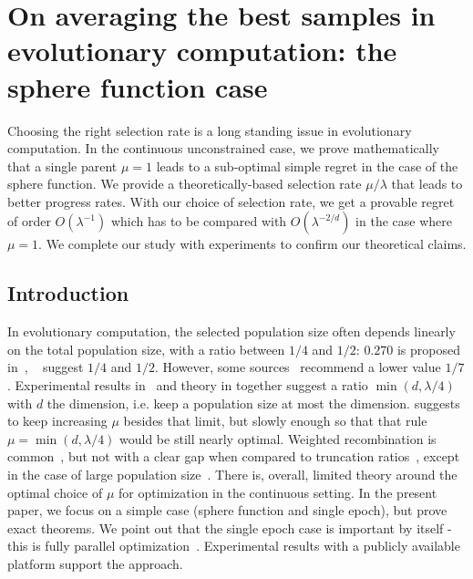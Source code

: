 \chapter{On averaging the best samples in evolutionary computation: the sphere function case}
Choosing the right selection rate is a long standing issue in evolutionary computation. {In the continuous unconstrained case, }we prove mathematically that a single parent $\mu=1$ leads to a sub-optimal simple regret in the case of the sphere function. We provide a theoretically-based selection rate $\mu/\lambda$ that leads  to better progress rates. With our choice of selection rate, we get a provable regret of order $O(\lambda^{-1})$ which has to be compared with $O(\lambda^{-2/d})$ in the case where $\mu=1$. We complete our study with experiments to confirm our theoretical claims. %
\section{Introduction}
In evolutionary computation, the selected population size often depends linearly on the total population size, with a ratio between $1/4$ and $1/2$: $0.270$ is proposed in~\cite{escompr}, ~\cite{HAN,cmsa} suggest $1/4$ and $1/2$.
However,
some sources~\cite{amorales} recommend a lower value $1/7$. Experimental results in~\cite{ratio} and theory in \cite{fournierAlgorithmica} together suggest a ratio $\min(d,\lambda/4)$ with $d$ the dimension, i.e. keep a population size at most the dimension. \cite{jeb} suggests to keep increasing $\mu$ besides that limit, but slowly enough so that that rule $\mu=\min(d,\lambda/4)$ would be still nearly optimal. Weighted recombination is common~\cite{weightdirk}, but not with a clear gap when compared to truncation ratios~\cite{esniko}, except in the case of large population size~\cite{sumotori}.
There is, overall, limited theory around the optimal choice of $\mu$ for optimization in the continuous setting. 
In the present paper, we focus on a simple case (sphere function and single epoch), but prove exact theorems. 
We point out that the single epoch case is important {by} itself - this is fully parallel optimization~\cite{nie,mckay,bergstra2012random,bousquet}.
Experimental results with a publicly available platform support the approach.
